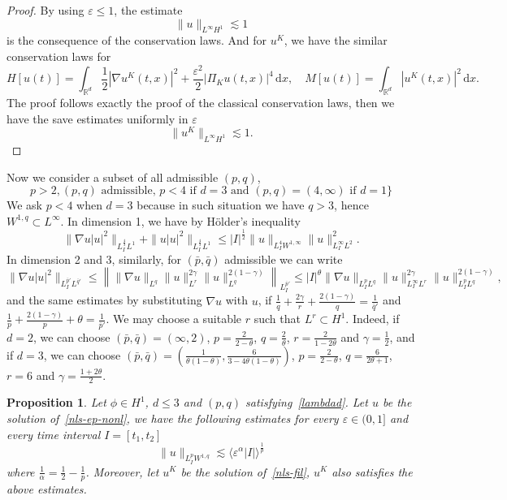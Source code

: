 \documentclass[10pt,a4paper]{article}
\newtheorem{proposition}[theorem]{Proposition}
\begin{document}
  \begin{proof}
    By using \( \varepsilon \leq 1 \), the estimate 
    \[ \|u\|_{L^\infty H^1} \lesssim 1 \]
    is the consequence of the conservation laws. And for \(u^K\), we have the
    similar conservation laws for 
    \[ H[u(t)] = \int_{\mathbb R^d} \frac12|\nabla u^K(t,x)|^2 + 
    \frac{\varepsilon^2}2 |\Pi_K u(t,x)|^4 \,\mathrm{d}x, \quad M[u(t)] = 
    \int_{\mathbb R^d} |u^K(t,x)|^2 \,\mathrm{d}x. \]
    The proof follows exactly the proof of the classical conservation laws, then
    we have the save estimates uniformly in \(\varepsilon\)
    \[ \|u^K\|_{L^\infty H^1} \lesssim 1.\]
  \end{proof}


  Now we consider a subset of all admissible \((p,q)\),
  \begin{equation}\label{lambdad}
    p>2, (p,q)\text{ admissible, } p<4 \text{ if } d=3 \text{ and }
    (p,q)= (4,\infty) \text{ if } d=1\}
  \end{equation}
  We ask \(p<4\) when \(d=3\) because in such situation we have \(q>3\), hence
  \(W^{1,q} \subset L^\infty\).
  In dimension 1, we have by H\"older's inequality
  \[ \|\nabla u|u|^2\|_{L^\frac43_I L^1} + \|u|u|^2\|_{L^\frac43_I L^1} \leq 
  |I|^\frac12 \|u\|_{L^4_I W^{1,\infty}} \|u\|^2_{L^\infty_I L^2}. \]
  In dimension 2 and 3, similarly, for \((\bar{p},\bar{q})\) admissible we can write
  \begin{equation}\label{XT}
    \|\nabla u |u|^2\|_{L^{\bar{p}'}_I L^{\bar{q}'}} \leq \left\| 
    \|\nabla u\|_{L^q} \|u\|_{L^r}^{2\gamma} \|u\|_{L^q}^{2(1-\gamma)}
    \right\|_{L^{\bar{p}'}_I} \leq |I|^\theta \|\nabla u\|_{L^p_I L^q} 
    \|u\|_{L^\infty_I L^r}^{2\gamma} \|u\|_{L^p_I L^q}^{2(1-\gamma)},
  \end{equation}
  and the same estimates by substituting \(\nabla u\) with \(u\),
  if \( \frac1q + \frac{2\gamma}r + \frac{2(1-\gamma)}q = \frac1{\bar{q}'} \)
  and \( \frac1p + \frac{2(1-\gamma)}p + \theta = \frac1{\bar{p}'} \). We may
  choose a suitable \(r\) such that \(L^r \subset H^1\). Indeed, if \(d=2\),
  we can choose \((\bar{p},\bar{q})=(\infty,2)\), \(p=\frac2{2-\theta}\),
  \(q=\frac2\theta\), \(r=\frac2{1-2\theta}\) and \(\gamma=\frac12\), and if
  \(d=3\), we can choose \((\bar{p},\bar{q})=(\frac1{\theta(1-\theta)},\frac6{3-4\theta(1-\theta)})\), 
  \(p=\frac2{2-\theta}\), \(q=\frac6{2\theta+1}\), \(r=6\) and \(\gamma=\frac{1+2\theta}2\).

  \begin{proposition}
    Let \(\phi \in H^1\), \( d \leq 3 \) and \((p,q)\) satisfying~\eqref{lambdad}. 
    Let \( u \) be the solution of~\eqref{nls-ep-nonl}, we
    have the following estimates for every \( \varepsilon \in (0,1] \) and every
    time interval \( I = [t_1,t_2] \)
    \[ \|u\|_{L^p_I W^{1,q}} \lesssim
    \langle\varepsilon^\alpha |I|\rangle^{\frac1p} \]
    where \( \frac1\alpha = \frac12 - \frac1p \). Moreover, let \( u^K \) be the
    solution of~\eqref{nls-fil}, \(u^K\) also satisfies the above estimates. 
  \end{proposition}
\end{document}
